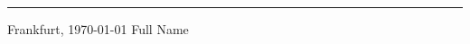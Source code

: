 \documentclass[twoside,11pt,titlepage,a4paper,english,bibliography=totocnumbered,listof=numbered]{scrbook}
\begin{document}
\vspace{30 mm}
\begin{flushright}

\rule{90mm}{1pt}

Frankfurt, \today \hspace{15 mm} Full Name
\end{flushright}
\clearpage

\cleardoublepage{}

\newpage



%
\thispagestyle{empty}

\tableofcontents{\thispagestyle{empty}}

\mainmatter








\backmatter

\listoftables
\listoffigures

\setwidesite{}		
\printbibliography


\begin{appendices}




\end{appendices}
\end{document}
